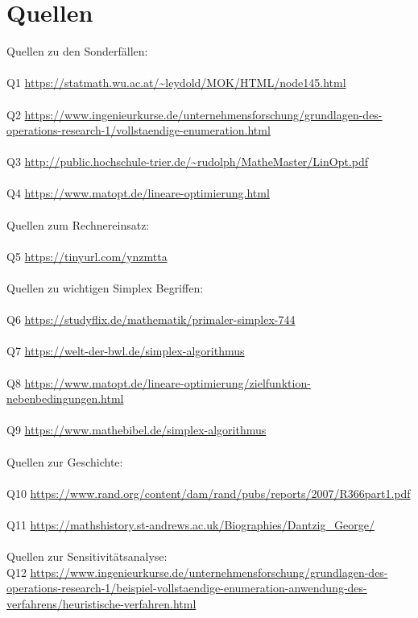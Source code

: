 \section{Quellen}
Quellen zu den Sonderfällen:\\~\\
Q1 \url{https://statmath.wu.ac.at/~leydold/MOK/HTML/node145.html}\\\\
Q2 \url{https://www.ingenieurkurse.de/unternehmensforschung/grundlagen-des-operations-research-1/vollstaendige-enumeration.html}\\\\
Q3 \url{http://public.hochschule-trier.de/~rudolph/MatheMaster/LinOpt.pdf}\\\\
Q4 \url{https://www.matopt.de/lineare-optimierung.html}\\\\
Quellen zum Rechnereinsatz:\\~\\
Q5 \url{https://tinyurl.com/ynzmtta}\\\\
Quellen zu wichtigen Simplex Begriffen:\\\\
Q6 \url{https://studyflix.de/mathematik/primaler-simplex-744}\\\\
Q7 \url{https://welt-der-bwl.de/simplex-algorithmus}\\\\
Q8 \url{https://www.matopt.de/lineare-optimierung/zielfunktion-nebenbedingungen.html}\\\\
Q9 \url{https://www.mathebibel.de/simplex-algorithmus}\\\\
Quellen zur Geschichte:\\\\
Q10 \url{https://www.rand.org/content/dam/rand/pubs/reports/2007/R366part1.pdf}\\\\
Q11 \url{https://mathshistory.st-andrews.ac.uk/Biographies/Dantzig_George/}\\\\
Quellen zur Sensitivitätsanalyse:\\
Q12 \url{https://www.ingenieurkurse.de/unternehmensforschung/grundlagen-des-operations-research-1/beispiel-vollstaendige-enumeration-anwendung-des-verfahrens/heuristische-verfahren.html}




